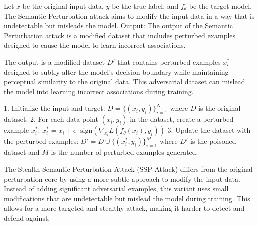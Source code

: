 Let \( x \) be the original input data, \( y \) be the true label, and \( f_{\theta} \) be the target model. The Semantic Perturbation attack aims to modify the input data in a way that is undetectable but misleads the model.
Output: The output of the Semantic Perturbation attack is a modified dataset that includes perturbed examples designed to cause the model to learn incorrect associations.

The output is a modified dataset \( D' \) that contains perturbed examples \( x_i^* \) designed to subtly alter the model’s decision boundary while maintaining perceptual similarity to the original data. This adversarial dataset can mislead the model into learning incorrect associations during training.


1. Initialize the input and target:
   $
   D = \{(x_i, y_i)\}_{i=1}^N
   $
   where \( D \) is the original dataset.
2. For each data point \( (x_i, y_i) \) in the dataset, create a perturbed example \( x_i^* \):
   $
   x_i^* = x_i + \epsilon \cdot \text{sign}(\nabla_{x_i} L(f_{\theta}(x_i), y_i))
   $
3. Update the dataset with the perturbed examples:
   $
   D' = D \cup \{(x_i^*, y_i)\}_{i=1}^M
   $
   where \( D' \) is the poisoned dataset and \( M \) is the number of perturbed examples generated.

The Stealth Semantic Perturbation Attack (SSP-Attack) differs from the original perturbation core by using a more subtle approach to modify the input data. Instead of adding significant adversarial examples, this variant uses small modifications that are undetectable but mislead the model during training. This allows for a more targeted and stealthy attack, making it harder to detect and defend against.